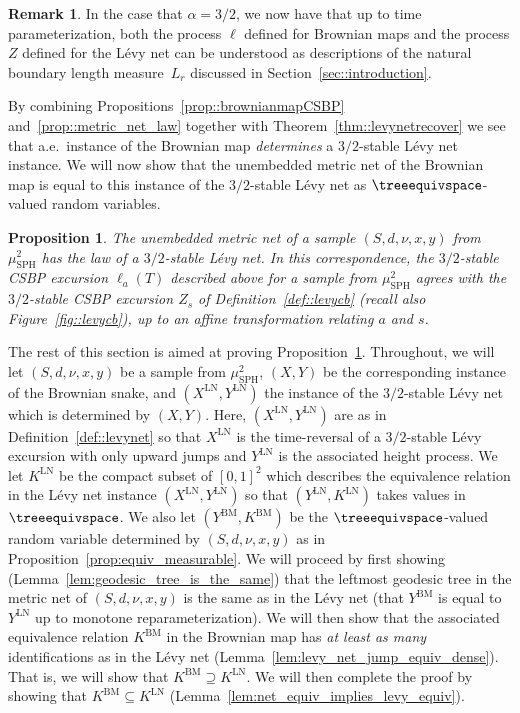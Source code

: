 \documentclass[10pt]{amsart}
\theoremstyle{plain}
\numberwithin{theorem}{section}
\newtheorem{proposition}[theorem]{Proposition}
\theoremstyle{definition}
\newtheorem{remark}[theorem]{Remark}
\newcommand{\mustwo}{\mu_{\mathrm{SPH}}^2}
\begin{document}
\begin{remark}
\label{rem::brownian_map_boundary_length}
In the case that $\alpha = 3/2$, we now have that up to time parameterization, both the process $\ell$ defined for Brownian maps and the process $Z$ defined for the Lévy net can be understood as descriptions of the natural boundary length measure~$L_{r}$ discussed in Section~\ref{sec::introduction}.
\end{remark}

By combining Propositions~\ref{prop::brownianmapCSBP} and~\ref{prop::metric_net_law} together with Theorem~\ref{thm::levynetrecover} we see that a.e.\ instance of the Brownian map \emph{determines} a $3/2$-stable Lévy net instance. We will now show that the unembedded metric net of the Brownian map is equal to this instance of the $3/2$-stable Lévy net as $\treeequivspace$-valued random variables.

\begin{proposition}
\label{prop:metric_net_equivalent}
The unembedded metric net of a sample $(S,d,\nu,x,y)$ from $\mustwo$ has the law of a $3/2$-stable Lévy net. In this correspondence, the $3/2$-stable CSBP excursion $\ell_a(T)$ described above for a sample from $\mustwo$ agrees with the $3/2$-stable CSBP excursion $Z_s$ of Definition~\ref{def::levycb} (recall also Figure~\ref{fig::levycb}), up to an affine transformation relating $a$ and $s$.
\end{proposition}

\newcommand{\LN}{\mathrm{LN}}
\newcommand{\BM}{\mathrm{BM}}

The rest of this section is aimed at proving Proposition~\ref{prop:metric_net_equivalent}. Throughout, we will let $(S,d,\nu,x,y)$ be a sample from $\mustwo$, $(X,Y)$ be the corresponding instance of the Brownian snake, and $(X^\LN,Y^\LN)$ the instance of the $3/2$-stable Lévy net which is determined by $(X,Y)$. Here, $(X^\LN,Y^\LN)$ are as in Definition~\ref{def::levynet} so that $X^\LN$ is the time-reversal of a $3/2$-stable Lévy excursion with only upward jumps and $Y^\LN$ is the associated height process. We let $K^\LN$ be the compact subset of $[0,1]^2$ which describes the equivalence relation in the Lévy net instance $(X^\LN,Y^\LN)$ so that $(Y^\LN,K^\LN)$ takes values in $\treeequivspace$. We also let $(Y^\BM,K^\BM)$ be the $\treeequivspace$-valued random variable determined by $(S,d,\nu,x,y)$ as in Proposition~\ref{prop:equiv_measurable}. We will proceed by first showing (Lemma~\ref{lem:geodesic_tree_is_the_same}) that the leftmost geodesic tree in the metric net of $(S,d,\nu,x,y)$ is the same as in the Lévy net (\ie that $Y^\BM$ is equal to $Y^\LN$ up to monotone reparameterization). We will then show that the associated equivalence relation $K^\BM$ in the Brownian map has \emph{at least as many} identifications as in the Lévy net (Lemma~\ref{lem:levy_net_jump_equiv_dense}). That is, we will show that $K^\BM \supseteq K^\LN$. We will then complete the proof by showing that $K^\BM \subseteq K^\LN$ (Lemma~\ref{lem:net_equiv_implies_levy_equiv}).
\end{document}
